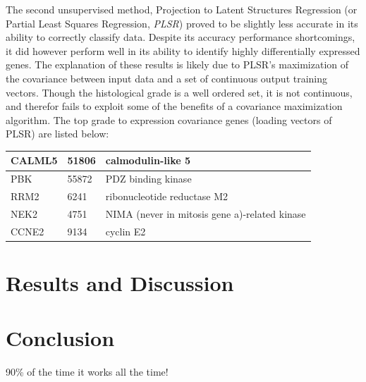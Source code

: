 \documentclass[a4paper,10pt]{article}
\begin{document}
The second unsupervised method, Projection to Latent Structures Regression (or Partial Least Squares Regression, \emph{PLSR})\cite{Wold1} proved to 
be slightly less accurate in its ability to correctly classify data. Despite its accuracy performance shortcomings, it did however
perform well in its ability to identify highly differentially expressed genes. The explanation of these results is likely due to PLSR's maximization of the covariance
between input data and a set of continuous output training vectors. Though the histological grade is a well ordered set, it is not continuous, and therefor fails to
exploit some of the benefits of a covariance maximization algorithm. The top grade to expression covariance genes (loading vectors of PLSR) are listed below:
\begin{center}
\begin{tabular}{| l | l | l |}
\hline
CALML5 & 51806 & calmodulin-like 5\\ \hline
PBK & 55872 & PDZ binding kinase\\ \hline
RRM2 & 6241 & ribonucleotide reductase M2\\ \hline
NEK2 & 4751 & NIMA (never in mitosis gene a)-related kinase\\ \hline
CCNE2 & 9134 & cyclin E2 \\ \hline
 \end{tabular}
\end{center}




\section{Results and Discussion}
\section{Conclusion}
90\% of the time it works all the time!\\

 \markright{ }
\end{document}

